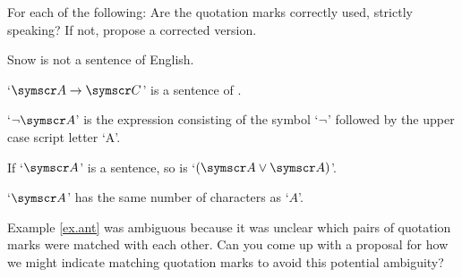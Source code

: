 

\practiceproblems

\problempart
\label{pr.usemention}
For each of the following: Are the quotation marks correctly used, strictly speaking? If not, propose a corrected version.
\begin{earg}
\item Snow is not a sentence of English.
\item `$\meta{A} \eif \meta{C}$' is a sentence of \TFL.
\item `$\enot\meta{A}$' is the expression consisting of the symbol `$\neg$' followed by the upper case script letter `A'. %
\item If `$\meta{A}$' is a sentence, so is `$(\meta{A} \eor \meta{A})$'. %
\item `$\meta{A}$' has the same number of characters as `$A$'.
\end{earg}

\problempart Example \ref{ex.ant} was ambiguous because it was unclear which pairs of quotation marks were matched with each other. Can you come up with a proposal for how we might indicate matching quotation marks to avoid this potential ambiguity?

